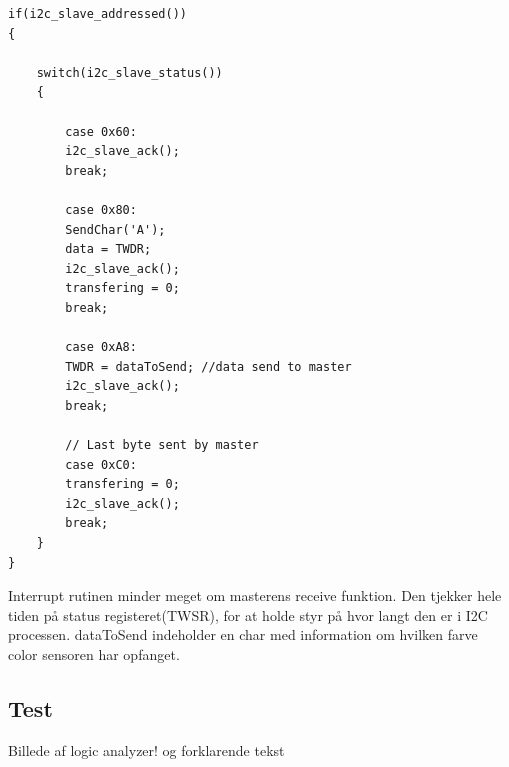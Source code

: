 \begin{lstlisting}
if(i2c_slave_addressed())
{
	
	switch(i2c_slave_status())
	{
		
		case 0x60:
		i2c_slave_ack();
		break;
		
		case 0x80:
		SendChar('A');
		data = TWDR;
		i2c_slave_ack();
		transfering = 0;
		break;
		
		case 0xA8:
		TWDR = dataToSend; //data send to master
		i2c_slave_ack();
		break;
		
		// Last byte sent by master
		case 0xC0:
		transfering = 0;
		i2c_slave_ack();
		break;
	}
}
\end{lstlisting}

Interrupt rutinen minder meget om masterens receive funktion. Den tjekker hele tiden på status registeret(TWSR), for at holde styr på hvor langt den er i I2C processen. dataToSend indeholder en char med information om hvilken farve color sensoren har opfanget. 



\subsection{Test}

Billede af logic analyzer! og forklarende tekst

